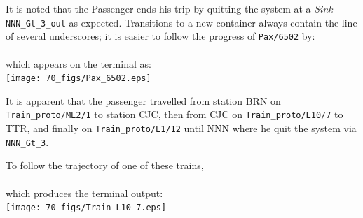It is noted that the Passenger ends his trip by quitting the system at a \emph{Sink} {\tt NNN\_Gt\_3\_out} as expected.
Transitions to a new container always contain the line of several underscores; it is easier to follow the
progress of {\tt Pax/6502} by:\\
\\
which appears on the terminal as:\\
\texttt{[image: 70\_figs/Pax\_6502.eps]}
\vspace{0.5cm}

It is apparent that the passenger travelled from station BRN on {\tt Train\_proto/ML2/1} to station CJC,
then from CJC on {\tt Train\_proto/L10/7} to TTR, and finally on {\tt Train\_proto/L1/12} until
NNN where he quit the system via {\tt NNN\_Gt\_3}.

To follow the trajectory of one of these trains,\\
\\
which produces the terminal output:\\
\texttt{[image: 70\_figs/Train\_L10\_7.eps]}
\vspace{0.5cm}

